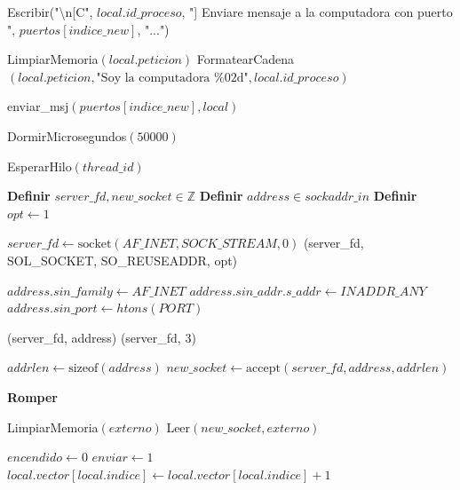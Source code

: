 \begin{tcolorbox}[colback=white, colframe=azul_unam, title=Pseudocódigo: cnx\_vectores.c (Conexión P2P Vectorial), breakable]
\begin{algorithmic}[1]
            \State Escribir("\textbackslash n[C", $local.id\_proceso$, "] Enviare mensaje a la computadora con puerto ", $puertos[indice\_new]$, "...")
            
            \State LimpiarMemoria$(local.peticion)$
            \State FormatearCadena$(local.peticion, \text{"Soy la computadora \%02d"}, local.id\_proceso)$
            
            \State enviar\_msj$(puertos[indice\_new], local)$
        \EndIf
        
        \State DormirMicrosegundos$(50000)$
        
    \EndWhile

    \State EsperarHilo$(thread\_id)$

\EndProcedure

\vspace{0.3cm}



    \State \textbf{Definir} $server\_fd, new\_socket \in \mathbb{Z}$
    \State \textbf{Definir} $address \in sockaddr\_in$
    \State \textbf{Definir} $opt \gets 1$

    \State $server\_fd \gets \text{socket}(AF\_INET, SOCK\_STREAM, 0)$
    \State {}(server\_fd, SOL\_SOCKET, SO\_REUSEADDR, opt)

    \State $address.sin\_family \gets AF\_INET$
    \State $address.sin\_addr.s\_addr \gets INADDR\_ANY$
    \State $address.sin\_port \gets htons(PORT)$

    \State {}(server\_fd, address)
    \State {}(server\_fd, 3)

        
        \State $addrlen \gets \text{sizeof}(address)$
        \State $new\_socket \gets \text{accept}(server\_fd, address, addrlen)$

            \State \textbf{Romper}
        \EndIf

        \State LimpiarMemoria$(externo)$
        \State Leer$(new\_socket, externo)$

         
            
                \State $encendido \gets 0$
                \State $enviar \gets 1$
                \State $local.vector[local.indice] \gets local.vector[local.indice] + 1$
            \EndIf
            

\end{algorithmic}
\end{tcolorbox}
